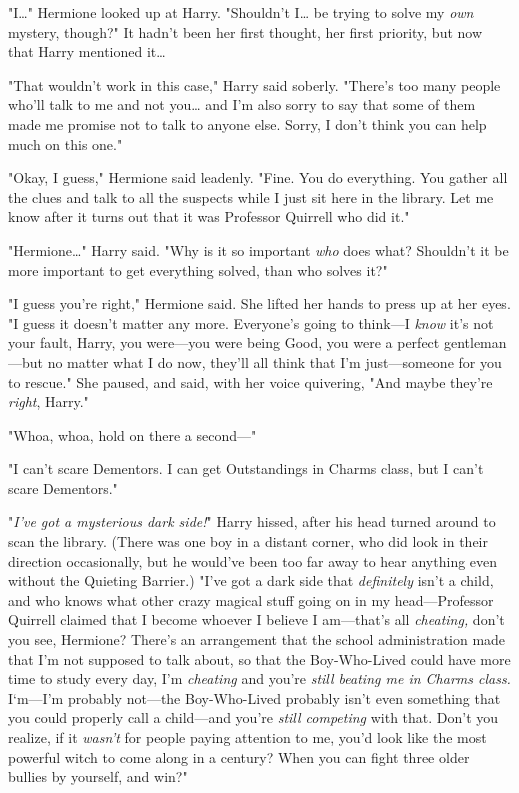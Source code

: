 "I{\ldots}" Hermione looked up at Harry. "Shouldn't I{\ldots} be trying to 
solve my \emph{own} mystery, though?" It hadn't been her first thought, her 
first priority, but now that Harry mentioned it{\ldots}

"That wouldn't work in this case," Harry said soberly. "There's too many people 
who'll talk to me and not you{\ldots} and I'm also sorry to say that some of 
them made me promise not to talk to anyone else. Sorry, I don't think you can 
help much on this one."

"Okay, I guess," Hermione said leadenly. "Fine. You do everything. You gather 
all the clues and talk to all the suspects while I just sit here in the 
library. Let me know after it turns out that it was Professor Quirrell who did 
it."

"Hermione{\ldots}" Harry said. "Why is it so important \emph{who} does what? 
Shouldn't it be more important to get everything solved, than who solves it?"

"I guess you're right," Hermione said. She lifted her hands to press up at her 
eyes. "I guess it doesn't matter any more. Everyone's going to think---I 
\emph{know} it's not your fault, Harry, you were---you were being Good, you 
were a perfect gentleman---but no matter what I do now, they'll all think that 
I'm just---someone for you to rescue." She paused, and said, with her voice 
quivering, "And maybe they're \emph{right}, Harry."

"Whoa, whoa, hold on there a second---"

"I can't scare Dementors. I can get Outstandings in Charms class, but I can't 
scare Dementors."

"\emph{I've got a mysterious dark side!}" Harry hissed, after his head turned 
around to scan the library. (There was one boy in a distant corner, who did 
look in their direction occasionally, but he would've been too far away to hear 
anything even without the Quieting Barrier.) "I've got a dark side that 
\emph{definitely} isn't a child, and who knows what other crazy magical stuff 
going on in my head---Professor Quirrell claimed that I become whoever I 
believe I am---that's all \emph{cheating,} don't you see, Hermione? There's an 
arrangement that the school administration made that I'm not supposed to talk 
about, so that the Boy-Who-Lived could have more time to study every day, I'm 
\emph{cheating} and you're \emph{still beating me in Charms class.} I`m---I'm 
probably not---the Boy-Who-Lived probably isn't even something that you could 
properly call a child---and you're \emph{still competing} with that. Don't you 
realize, if it \emph{wasn't} for people paying attention to me, you'd look like 
the most powerful witch to come along in a century? When you can fight three 
older bullies by yourself, and win?"

